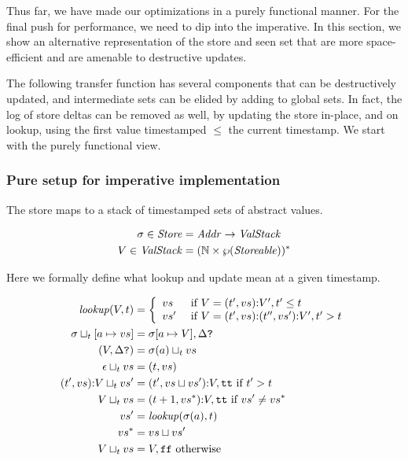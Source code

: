 \documentclass[preprint,onecolumn,9pt]{sigplanconf} %
\begin{document}
Thus far, we have made our optimizations in a purely functional
manner. For the final push for performance, we need to dip into the
imperative. In this section, we show an alternative representation of
the store and seen set that are more space-efficient and are amenable
to destructive updates.

The following transfer function has several components that can be
destructively updated, and intermediate sets can be elided by adding
to global sets. In fact, the log of store deltas can be removed as
well, by updating the store in-place, and on lookup, using the first
value timestamped $\le$ the current timestamp. We start with the
purely functional view.

\subsubsection{Pure setup for imperative implementation}

The store maps to a stack of timestamped sets of abstract values.

\begin{align*}
\sigma \in \mathit{Store} &= \mathit{Addr} \to \mathit{ValStack} \\
V \in \mathit{ValStack} &= ({\mathbb N} \times \wp(\mathit{Storeable}))^*
\end{align*}

Here we formally define what lookup and update mean at a given
timestamp.

\begin{align*}
\mathit{lookup}(V,t) &=
  \left\{
    \begin{array}{ll}
      v{s} & \text{ if } V = (t', v{s}) {\tt :} V', t' \le t \\
      v{s'} & \text{ if } V = (t', v{s}) {\tt :} (t'', v{s'}) {\tt :} V', t' > t
    \end{array}\right. \\
\sigma \sqcup_t [a \mapsto v{s}] &= \sigma[a \mapsto V],\Delta\mbox{{\tt ?}} \\
 (V,\Delta\mbox{{\tt ?}}) &= \sigma(a)\sqcup_t v{s} \\
\epsilon \sqcup_t v{s} &= (t, v{s}) \\
(t', v{s}) {\tt :} V \sqcup_t v{s'} &= (t', v{s}\sqcup v{s'}) {\tt :} V,{\tt tt} \text{ if } t' > t \\
V \sqcup_t v{s} &= (t+1, v{s^*}) {\tt :} V,{\tt tt}
           \text{ if } v{s'} \neq v{s^*} \\
 v{s'} &= \mathit{lookup}(\sigma(a),t) \\
 v{s^*} &= v{s} \sqcup v{s'} \\
V \sqcup_t v{s} &= V,{\tt ff} \text{ otherwise}
\end{align*}
\end{document}
